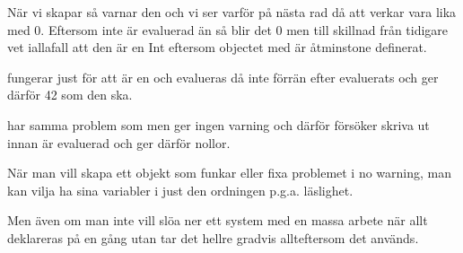 När vi skapar  så varnar den och vi ser varför på nästa rad då att  verkar vara lika med 0. Eftersom  inte är evaluerad än så blir det 0 men till skillnad från tidigare vet  iallafall att den är en Int eftersom objectet med  är åtminstone definerat.

 fungerar just för att  är en  och evalueras då inte förrän efter  evaluerats och ger därför 42 som den ska.

 har samma problem som  men ger ingen varning och därför försöker skriva ut innan  är evaluerad och ger därför nollor.

\SubtaskSolved
När man vill skapa ett objekt som funkar eller fixa problemet i no warning, man kan vilja ha sina variabler i just den ordningen p.g.a. läslighet.

Men även om man inte vill slöa ner ett system med en massa arbete när allt deklareras på en gång utan tar det hellre gradvis allteftersom det används.

\QUESTEND
